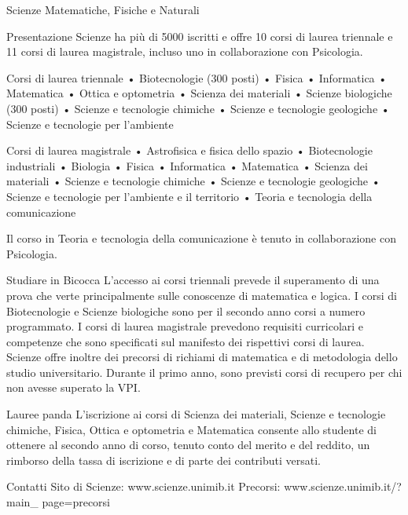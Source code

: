 Scienze Matematiche, Fisiche e Naturali

Presentazione
Scienze ha più di 5000 iscritti e offre 10 corsi di laurea triennale e 11 corsi di laurea magistrale, incluso uno in collaborazione con Psicologia. 

Corsi di laurea triennale
     • Biotecnologie (300 posti) 
     • Fisica 
     • Informatica 
     • Matematica 
     • Ottica e optometria 
     • Scienza dei materiali 
     • Scienze biologiche (300 posti) 
     • Scienze e tecnologie chimiche 
     • Scienze e tecnologie geologiche 
     • Scienze e tecnologie per l'ambiente 

Corsi di laurea magistrale
     • Astrofisica e fisica dello spazio 
     • Biotecnologie industriali 
     • Biologia 
     • Fisica 
     • Informatica 
     • Matematica 
     • Scienza dei materiali 
     • Scienze e tecnologie chimiche 
     • Scienze e tecnologie geologiche 
     • Scienze e tecnologie per l'ambiente e il territorio 
     • Teoria e tecnologia della comunicazione 

Il corso in Teoria e tecnologia della comunicazione è tenuto in collaborazione con Psicologia. 

Studiare in Bicocca
L'accesso ai corsi triennali prevede il superamento di una prova che verte principalmente sulle conoscenze di matematica e logica. I corsi di Biotecnologie e Scienze biologiche sono per il secondo anno corsi a numero programmato. I corsi di laurea magistrale prevedono requisiti curricolari e competenze che sono specificati sul manifesto dei rispettivi corsi di laurea. 
Scienze offre inoltre dei precorsi di richiami di matematica e di metodologia dello studio universitario. Durante il primo anno, sono previsti corsi di recupero per chi non avesse superato la VPI. 

Lauree panda  
L'iscrizione ai corsi di Scienza dei materiali, Scienze e tecnologie chimiche, Fisica, Ottica e optometria e Matematica consente allo studente di ottenere al secondo anno di corso, tenuto conto del merito e del reddito, un rimborso della tassa di iscrizione e di parte dei contributi versati. 

Contatti
Sito di Scienze: www.scienze.unimib.it 
Precorsi: www.scienze.unimib.it/?main\_ page=precorsi 

